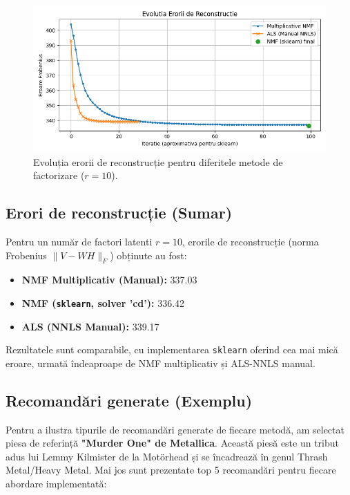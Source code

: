 \documentclass[12pt,a4paper]{article}
\begin{document}
	\begin{figure}[htbp]
		\centering
		\includegraphics[width=1.0\textwidth]{figure1.png} 
		\caption{Evoluția erorii de reconstrucție pentru diferitele metode de factorizare ($r=10$).}
		\label{fig:error_plot}
	\end{figure}
	
	\subsection{Erori de reconstrucție (Sumar)} 
	Pentru un număr de factori latenti $r=10$, erorile de reconstrucție (norma Frobenius $\|V - WH\|_F$) obținute au fost:
	\begin{itemize}
		\item \textbf{NMF Multiplicativ (Manual):} 337.03
		\item \textbf{NMF (\texttt{sklearn}, solver 'cd'):} 336.42
		\item \textbf{ALS (NNLS Manual):} 339.17
	\end{itemize}
	Rezultatele sunt comparabile, cu implementarea \texttt{sklearn} oferind cea mai mică eroare, urmată îndeaproape de NMF multiplicativ și ALS-NNLS manual.
	
	\subsection{Recomandări generate (Exemplu)}
	\label{subsec:recomandari-exemplu}
	
	Pentru a ilustra tipurile de recomandări generate de fiecare metodă, am selectat piesa de referință \textbf{"Murder One" de Metallica}. Această piesă este un tribut adus lui Lemmy Kilmister de la Motörhead și se încadrează în genul Thrash Metal/Heavy Metal. Mai jos sunt prezentate top 5 recomandări pentru fiecare abordare implementată:
	
\end{document}
